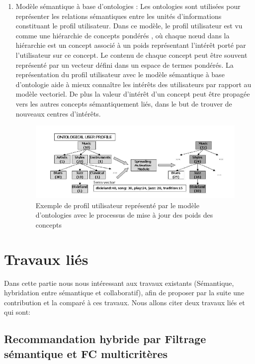 \documentclass[a4paper,12pt,letterpaper,headsepline,singlespacing,headsepline, french]{report}
\begin{document}
\begin{enumerate}
 \item Modèle sémantique à base d’ontologies : Les ontologies sont utilisées pour représenter les relations sémantiques entre les unités d’informations constituant le profil utilisateur. Dans ce modèle, le profil utilisateur est vu comme une hiérarchie de concepts pondérés \cite{ref26}, où chaque nœud dans la hiérarchie est un concept associé à un poids représentant l’intérêt porté par l’utilisateur sur ce concept.  Le contenu de chaque concept peut être souvent représenté par un vecteur défini dans un espace de termes pondérés. La représentation du profil utilisateur avec le modèle sémantique à base d’ontologie aide à mieux connaître les intérêts des utilisateurs par rapport au modèle vectoriel. De plus la valeur d’intérêt d’un concept peut être propagée vers les autres concepts sémantiquement liés, dans le but de trouver de nouveaux centres d’intérêts.

 
 \begin{figure}[H]
 	\centering
\includegraphics[width=\textwidth]{profile_user.PNG}
 	\caption{ Exemple de profil utilisateur représenté par le modèle d’ontologies avec le processus de mise à jour des poids des concepts \cite{ref28}}
 \end{figure}
 

\end{enumerate}

\section {Travaux liés}
Dans cette partie nous nous intéressant aux travaux existants (Sémantique, hybridation entre sémantique et collaboratif), afin de proposer par la suite une contribution et la comparé à ces travaux. Nous allons citer deux travaux liés et qui sont:

\subsection{Recommandation hybride par Filtrage sémantique et FC multicritères}
\end{document}

